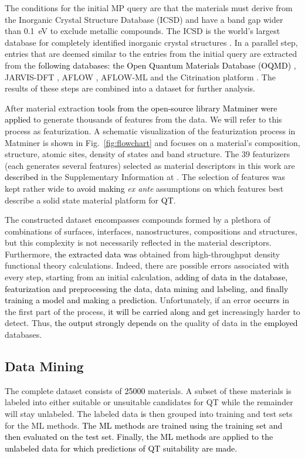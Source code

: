 \documentclass[superscriptaddress,unsortedaddress,
 amsmath,amssymb,
 aps,
]{revtex4-2}
\newcommand{\mrk}[1]{\textcolor{black}{#1}}
\begin{document}
The conditions for the initial MP query are that the materials must derive from the Inorganic Crystal Structure Database (ICSD) and have a band gap wider than \SI{0.1}{\electronvolt} to exclude metallic compounds.
The ICSD is the world's largest database for completely identified inorganic crystal structures  \cite{Allen1987,Zagorac2019}. In a parallel step, entries that are deemed similar to the entries from the initial query are extracted from the \mrk{following databases: the Open Quantum Materials Database (OQMD)}  \cite{Saal2013,Kirklin2015}, JARVIS-DFT \cite{Choudhary2020}, AFLOW \cite{Curtarolo2012, Curtarolo2012a, Calderon2015}, AFLOW-ML \cite{Isayev2017} and the Citrination platform \cite{OMaraJordan2016MDIA}. The results of these steps are combined into a dataset for further analysis. 

After material extraction \mrk{tools from the open-source library Matminer \cite{Ward2018} were applied} to generate thousands of features from the data. We will refer to this process as featurization. A schematic visualization of the featurization process in Matminer is shown in  Fig.~\ref{fig:flowchart} 
and focuses on a material's composition,  structure, atomic sites, density of states and band structure. 
The $39$ featurizers (each generates several features) selected as material descriptors in this work are \mrk{described} in the Supplementary Information at \cite{supplementary}. The selection of features was kept rather wide \mrk{to avoid making} {\em ex ante} assumptions on which features best describe a solid state material platform for \mrk{QT}. 

The constructed dataset encompasses compounds formed by a plethora of combinations of surfaces, interfaces, nanostructures, compositions and structures, but this complexity is not necessarily reflected in the material descriptors. 
Furthermore, \mrk{the extracted data was}  obtained from high-throughput density functional theory calculations. Indeed, there are possible errors associated with every step, starting from an initial calculation, \mrk{adding of data in the database, featurization and preprocessing the data, data mining and labeling, and finally training a model and making a prediction.}  Unfortunately, if an error \mrk{occurrs} in the first part of the process, \mrk{it will be  carried along and get} increasingly harder to detect. Thus, \mrk{the output strongly depends}  on the quality of data in the \mrk{employed} databases. 

\subsection*{Data Mining}
The complete dataset consists of \mrk{\num{25000}} materials. A subset of these materials is labeled into either suitable or unsuitable candidates for QT while the remainder will stay unlabeled. The labeled data \mrk{is} then grouped into training and test sets for the ML methods. \mrk{The ML methods are trained using the training set and then evaluated on the test set. Finally, the ML methods are applied to the unlabeled data for which predictions of QT suitability are made.}
\end{document}
